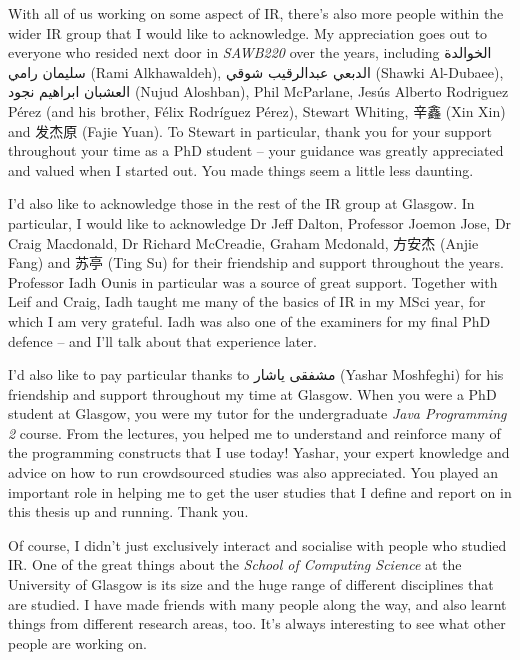 \begin{preamble}
With all of us working on some aspect of IR, there's also more people within the wider IR group that I would like to acknowledge. My appreciation goes out to everyone who resided next door in \emph{SAWB220} over the years, including {\arabicfont  الخوالدة سليمان رامي} (Rami Alkhawaldeh), {\arabicfont الدبعي عبدالرقيب شوقي} (Shawki Al-Dubaee), {\arabicfont العشبان ابراهيم نجود} (Nujud Aloshban), Phil McParlane, Jes\'{u}s Alberto Rodriguez P\'{e}rez (and his brother, F\'{e}lix Rodr\'{i}guez P\'{e}rez), Stewart Whiting, {\asianfont 辛鑫} (Xin Xin) and {\asianfont 发杰原} (Fajie Yuan). To Stewart in particular, thank you for your support throughout your time as a PhD student -- your guidance was greatly appreciated and valued when I started out. You made things seem a little less daunting.

I'd also like to acknowledge those in the rest of the IR group at Glasgow. In particular, I would like to acknowledge Dr Jeff Dalton, Professor Joemon Jose, Dr Craig Macdonald, Dr Richard McCreadie, Graham Mcdonald, {\asianfont 方安杰} (Anjie Fang) and {\asianfont 苏亭} (Ting Su) for their friendship and support throughout the years. Professor Iadh Ounis in particular was a source of great support. Together with Leif and Craig, Iadh taught me many of the basics of IR in my MSci year, for which I am very grateful. Iadh was also one of the examiners for my final PhD defence -- and I'll talk about that experience later.

I'd also like to pay particular thanks to {\farsifont مشفقى ياشار} (Yashar Moshfeghi) for his friendship and support throughout my time at Glasgow. When you were a PhD student at Glasgow, you were my tutor for the undergraduate \emph{Java Programming 2} course. From the lectures, you helped me to understand and reinforce many of the programming constructs that I use today! Yashar, your expert knowledge and advice on how to run crowdsourced studies was also appreciated. You played an important role in helping me to get the user studies that I define and report on in this thesis up and running. Thank you.

Of course, I didn't just exclusively interact and socialise with people who studied IR. One of the great things about the \emph{School of Computing Science} at the University of Glasgow is its size and the huge range of different disciplines that are studied. I have made friends with many people along the way, and also learnt things from different research areas, too. It's always interesting to see what other people are working on.


\end{preamble}
